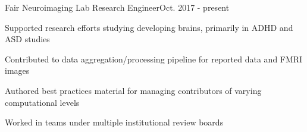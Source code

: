 \documentclass{article}
\newenvironment{**mylist}[2]{
  \subsubsection*{#1\hfill\small#2}
  \small
  \begin{list}{}{}
   \setlength{\topsep}{0pt}
   \setlength{\itemsep}{1pt}
   \setlength{\parskip}{0pt}
   \setlength{\parsep}{0pt}}{\end{list}\normalsize}
\newcommand{\LU}[1]{\hspace{-1em}{\bf Languages Used : #1}}
\begin{document}
\begin{comment}
\begin{**mylist}{Honors and Related Activities}{}
\item Comap Mathematical Modeling Competition (Meritorious Winner) - Top 10\%\hfill- Feb. 2012
\item Comap Mathematical Modeling Competition (Honorable Mention) { }- Top 30\%\hfill- Feb. 2011
\end{**mylist}
\end{comment}

\begin{**mylist}{Fair Neuroimaging Lab \tabb Research Engineer}{Oct. 2017 - present}
\item Supported research efforts studying developing brains, primarily in ADHD and ASD studies
\item Contributed to data aggregation/processing pipeline for reported data and FMRI images
\item Authored best practices material for managing contributors of varying computational levels
\item Worked in teams under multiple institutional review boards
\item \LU{Python, Bash, neo4j}
\end{**mylist}
\end{document}
